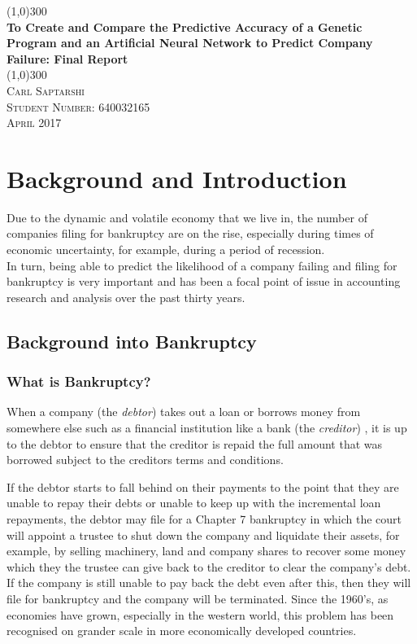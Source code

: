 \documentclass[11pt]{article}
\begin{document}
	\begin{titlepage}
		\begin{center}
			\line(1,0){300}\\
			[0.25in]
			\huge{\bfseries To Create and Compare the Predictive Accuracy of a Genetic Program and an Artificial Neural Network to Predict Company Failure: Final Report}\\
			\line(1,0){300}\\
			[1.5cm]
			
			 \textsc{Carl Saptarshi}\\
			 \textsc{\large  Student Number: 640032165 \\
			 April 2017}
			 
		\end{center}
	\end{titlepage}

\tableofcontents
\thispagestyle{empty}
\cleardoublepage
\setcounter{page}{1}
\section{Background and Introduction }\label{sec:intro}
Due to the dynamic and volatile economy that we live in, the number of companies filing for bankruptcy are on the rise, especially during times of economic uncertainty, for example, during a period of recession.\\
In turn, being able to predict the likelihood of a company failing and filing for bankruptcy is very important and has been a focal point of issue in accounting research and analysis over the past thirty years. 

\subsection{Background into Bankruptcy}
\subsubsection{What is Bankruptcy? }\label{sec:bankdef}
When a company (the \textit{debtor}) takes out a loan or borrows money from somewhere else such as a financial institution like a bank (the \textit{creditor}) , it is up to the debtor to ensure that the creditor is repaid the full amount that was borrowed subject to the creditors terms and conditions.


If the debtor starts to fall behind on their payments to the point that they are unable to repay their debts or unable to keep up with the incremental loan repayments, the debtor may file for a Chapter 7 bankruptcy in which the court will appoint a trustee to shut down the company and liquidate their assets, for example, by selling machinery, land and company shares to recover some money which they the trustee can give back to the creditor to clear the company's debt. If the company is still unable to pay back the debt even after this, then they will file for bankruptcy and the company will be terminated. Since the 1960's, as economies have grown, especially in the western world, this problem has been recognised on grander scale in more economically developed countries.
\end{document}
